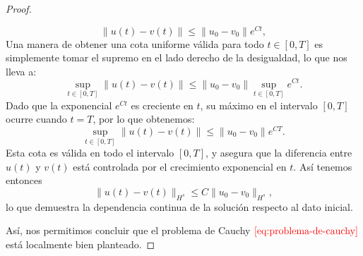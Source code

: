 \begin{proof}
\begin{enumerate}
                $$\|u(t) - v(t)\| \leq \|u_0 - v_0\| e^{Ct},$$
                Una manera de obtener una cota uniforme válida para todo $t \in [0, T]$ es simplemente tomar el supremo en el lado derecho de la desigualdad, lo que nos lleva a:
                $$\sup_{t \in [0, T]} \|u(t) - v(t)\| \leq \|u_0 - v_0\| \sup_{t \in [0, T]} e^{Ct}.$$
                Dado que la exponencial $e^{Ct}$ es creciente en $t$, su máximo en el intervalo $[0, T]$ ocurre cuando $t = T$, por lo que obtenemos:
                $$\sup_{t \in [0, T]} \|u(t) - v(t)\| \leq \|u_0 - v_0\| e^{C T}.$$
                Esta cota es válida en todo el intervalo $[0, T]$, y asegura que la diferencia entre $u(t)$ y $v(t)$ está controlada por el crecimiento exponencial en $t$. Así tenemos entonces
                $$\|u(t) - v(t)\|_{H^s} \leq C \|u_0 - v_0\|_{H^s},$$
                lo que demuestra la dependencia continua de la solución respecto al dato inicial.
        \end{enumerate}
        Así, nos permitimos concluir que el problema de Cauchy $\textcolor{red}{\ref{eq:problema-de-cauchy}}$ está localmente bien planteado.
    \end{proof}
\newpage
